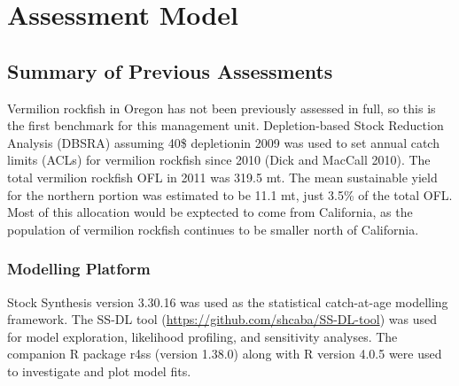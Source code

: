 \documentclass[11pt,
  english,
  a4paper,
]{article}
\begin{document}
\leavevmode\tagmcend\tagstructend\par


\hypertarget{assessment-model}{%
\section{Assessment Model}\label{assessment-model}}

\leavevmode\tagmcend\tagstructend


\hypertarget{summary-of-previous-assessments}{%
\subsection{Summary of Previous Assessments}\label{summary-of-previous-assessments}}

\leavevmode\tagmcend\tagstructend


Vermilion rockfish in Oregon has not been previously assessed in full, so this is the first benchmark for this management unit. Depletion-based Stock Reduction Analysis (DBSRA) assuming 40\$ depletionin 2009 was used to set annual catch limits (ACLs) for vermilion rockfish since 2010 {(Dick and MacCall 2010)\leavevmode\tagmcend\tagstructend}. The total vermilion rockfish OFL in 2011 was 319.5 mt. The mean sustainable yield for the northern portion was estimated to be 11.1 mt, just 3.5\% of the total OFL. Most of this allocation would be exptected to come from California, as the population of vermilion rockfish continues to be smaller north of California.

\leavevmode\tagmcend\tagstructend\par


\hypertarget{modelling-platform}{%
\subsubsection{Modelling Platform}\label{modelling-platform}}

\leavevmode\tagmcend\tagstructend


Stock Synthesis version 3.30.16 was used as the statistical catch-at-age modelling framework. The SS-DL tool ({\url{https://github.com/shcaba/SS-DL-tool}\leavevmode\tagmcend\tagstructend}) was used for model exploration, likelihood profiling, and sensitivity analyses. The companion R package r4ss (version 1.38.0) along with R version 4.0.5 were used to investigate and plot model fits.
\end{document}
